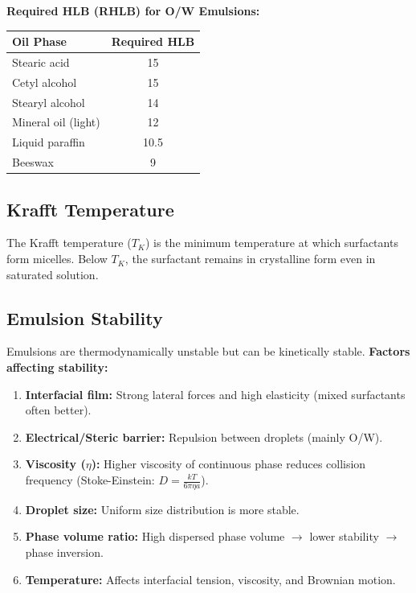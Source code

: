 \textbf{Required HLB (RHLB) for O/W Emulsions:}
\begin{center}
\begin{tabular}{l c}
\toprule
\textbf{Oil Phase} & \textbf{Required HLB} \\
\midrule
Stearic acid & 15 \\
Cetyl alcohol & 15 \\
Stearyl alcohol & 14 \\
Mineral oil (light) & 12 \\
Liquid paraffin & 10.5 \\
Beeswax & 9 \\
\bottomrule
\end{tabular}
\end{center}

\subsection{Krafft Temperature}
The Krafft temperature ($T_K$) is the minimum temperature at which surfactants form micelles. Below $T_K$, the surfactant remains in crystalline form even in saturated solution.

\subsection{Emulsion Stability}
Emulsions are thermodynamically unstable but can be kinetically stable.
\textbf{Factors affecting stability:}
\begin{enumerate}
    \item \textbf{Interfacial film:} Strong lateral forces and high elasticity (mixed surfactants often better).
    \item \textbf{Electrical/Steric barrier:} Repulsion between droplets (mainly O/W).
    \item \textbf{Viscosity ($\eta$):} Higher viscosity of continuous phase reduces collision frequency (Stoke-Einstein: $D = \frac{kT}{6\pi\eta a}$).
    \item \textbf{Droplet size:} Uniform size distribution is more stable.
    \item \textbf{Phase volume ratio:} High dispersed phase volume $\to$ lower stability $\to$ phase inversion.
    \item \textbf{Temperature:} Affects interfacial tension, viscosity, and Brownian motion.
\end{enumerate}

